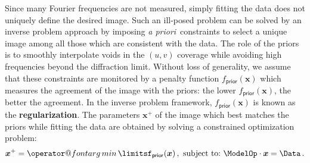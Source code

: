 \documentclass{article}
\makeatletter
\newcommand{\vocab}[1]{\textbf{#1}}
\newcommand{\MathFuncWithLimits}[1]{\mathop{\operator@font #1}\limits}
\newcommand{\Tag}[1]{\mathsf{#1}}        %
\newcommand{\V}[1]{\boldsymbol{#1}}      %
\newcommand{\argmin}{\MathFuncWithLimits{arg\,min}}
\newcommand{\apriori}{\textit{a priori}\xspace}
\newcommand{\uv}{$(u,v)$\xspace}
\newcommand{\Param}{x}
\newcommand{\VParam}{\V{\Param}}
\newcommand{\FeasibleSet}{\mathcal{X}}
\newcommand{\PriorTag}{\Tag{prior}}
\newcommand{\Fcost}{f}
\newcommand{\Fprior}{\Fcost_\PriorTag}
\makeatother
\begin{document}
Since many Fourier frequencies are not measured, simply fitting the data does
not uniquely define the desired image.  Such an ill-posed problem can be
solved by an inverse problem approach
\citep{Tarantola-2005-inverse_problem_theory} by imposing \apriori\
constraints to select a unique image among all those which are consistent with
the data.  The role of the priors is to smoothly interpolate voids in the \uv
coverage while avoiding high frequencies beyond the diffraction limit.
Without loss of generality, we assume that these constraints are monitored by
a penalty function $\Fprior(\VParam)$ which measures the agreement of the
image with the priors: the lower $\Fprior(\VParam)$, the better the agreement.
In the inverse problem framework, $\Fprior(\VParam)$ is known as the
\vocab{regularization}.  The parameters $\VParam^{+}$ of the image which
best matches the priors while fitting the data are obtained by solving a
constrained optimization problem:
\begin{equation}
  \label{eq:strict-data}
  \VParam^{+} = \argmin%
  \Fprior(\V{x}) \,,\ \text{subject to:\ }
  \ModelOp\cdot\VParam = \Data \, .
\end{equation}
\end{document}
